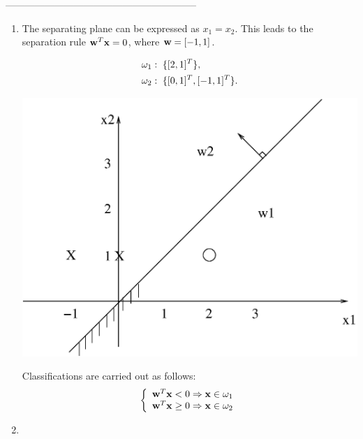 \documentclass[10pt]{article}
\newcommand{\vect}[1]{{\bf{#1}}}
\newcommand{\vw}{{\bf{w}}}
\newcommand{\vx}{{\bf{x}}}
\begin{document}
\begin{enumerate}
-----------------------------------------------------------


\begin{enumerate} 
\item

The separating plane can be expressed as $x_1 = x_2$. This leads to
the separation rule $\vect{w}^T \vect{x}=0$, where $\vect{w}=[-1,1]$.
 
\begin{align}
&\omega_1: \text{\;} \{[2,1]^T\}, \notag \\
&\omega_2: \text{\;} \{[0,1]^T, [-1,1]^T \}. \notag
\end{align}
\begin{center}
\includegraphics[scale=0.35]{e4_5.eps}
\end{center}

Classifications are carried out as follows:
\begin{equation*}
\left\{\begin{array}{l}
\vw^T\vx<0 \Rightarrow \vx \in \omega_1\\
\vw^T\vx\geq 0 \Rightarrow \vx \in \omega_2\\
\end{array}\right.
\end{equation*}

\item


\end{enumerate}
\end{enumerate}
\end{document}
